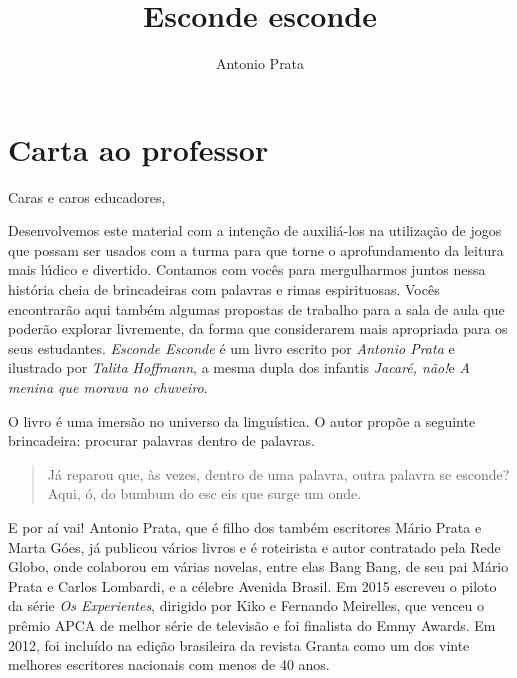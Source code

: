 \documentclass[11pt]{extarticle}
\newcommand{\AutorLivro}{Antonio Prata}
\newcommand{\TituloLivro}{Esconde esconde}
\newcommand{\colaborador}{Gabriela Karam}
\begin{document}
\title{\TituloLivro}
\author{\AutorLivro}
\def\authornotes{\colaborador}

\date{}
\maketitle


\tableofcontents

\section{Carta ao professor}

Caras e caros educadores,

Desenvolvemos este material com a intenção de auxiliá-los na utilização de jogos que possam ser usados com a turma para que torne o aprofundamento da leitura mais lúdico e divertido. Contamos com vocês para mergulharmos juntos nessa história cheia de brincadeiras com palavras e rimas espirituosas. Vocês encontrarão aqui também algumas propostas de trabalho para a sala de aula que poderão explorar livremente, da forma que considerarem mais apropriada para os seus estudantes. \textit{Esconde Esconde} é um livro escrito por \textit{Antonio Prata} e ilustrado por \textit{Talita Hoffmann}, a mesma dupla dos infantis \textit{Jacaré, não!}e \textit{A menina que morava no chuveiro}. 


O livro é uma imersão no universo da linguística. O autor propõe a seguinte brincadeira: procurar palavras dentro de palavras.

\begin{quote}

Já reparou que, às vezes, dentro de uma palavra, outra palavra se esconde? Aqui, ó, do bumbum do esc eis que surge um onde. 


\end{quote}

E por aí vai! Antonio Prata, que é  filho dos também escritores Mário Prata e Marta Góes, já publicou vários livros e é roteirista e autor contratado pela Rede Globo, onde colaborou em várias novelas, entre elas Bang Bang, de seu pai Mário Prata e Carlos Lombardi, e a célebre Avenida Brasil. Em 2015 escreveu o piloto da série \textit{Os Experientes}, dirigido por Kiko e Fernando Meirelles, que venceu o prêmio APCA de melhor série de televisão e foi finalista do Emmy Awards. Em 2012, foi incluído na edição brasileira da revista Granta como um dos vinte melhores escritores nacionais com menos de 40 anos.
\end{document}
